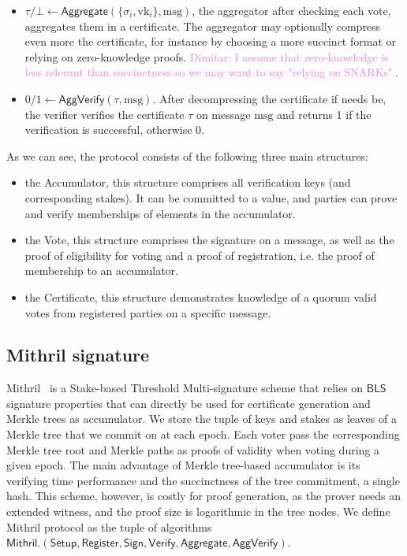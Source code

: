 \documentclass{article}
\newcommand{\vk}[1]{\ensuremath{\textrm{vk}_{#1}}\xspace}
\newcommand{\m}{\ensuremath{\textrm{msg}}\xspace}
\newcommand{\BLS}{\ensuremath{\mathsf{BLS}}\xspace}
\newcommand{\Mithril}{\ensuremath{\mathsf{Mithril}}\xspace}
\newcommand{\Sign}{\ensuremath{\mathsf{Sign}}\xspace}
\newcommand{\Verify}{\ensuremath{\mathsf{Verify}}\xspace}
\newcommand{\Aggregate}{\ensuremath{\mathsf{Aggregate}}\xspace}
\newcommand{\AggVerify}{\ensuremath{\mathsf{AggVerify}}\xspace}
\newcommand{\Setup}{\ensuremath{\mathsf{Setup}}\xspace}
\newcommand{\Register}{\ensuremath{\mathsf{Register}}\xspace}
\newcommand{\dimitar}[1]{\textcolor{violet}{Dimitar: #1}\xspace}
\begin{document}
\begin{itemize}
    \item $\tau / \bot \leftarrow \Aggregate(\{\sigma_i, \vk{i}\}, \m)$, the aggregator after checking each vote, aggregates them in a certificate.  The aggregator may optionally compress even more the certificate, for instance by choosing a more succinct format or relying on zero-knowledge proofs. \dimitar{I assume that zero-knowledge is less relevant than succinctness so we may want to say "relying on SNARKs".}. 
    
    \item $0/1 \leftarrow \AggVerify(\tau, \m)$.
    After decompressing the certificate if needs be, the verifier verifies the certificate $\tau$  on message \m and returns 1 if the verification is successful, otherwise 0.
\end{itemize}

As we can see, the protocol consists of the following three main structures:
\begin{itemize}
    \item the Accumulator, this structure comprises all verification keys (and corresponding stakes). It can be committed to a value, and parties can prove and verify memberships of elements in the accumulator.
    \item the Vote, this structure comprises the signature on a message, as well as the proof of eligibility for voting and a proof of registration, i.e. the proof of membership to an accumulator.
    \item the Certificate, this structure demonstrates knowledge of a quorum valid votes from registered parties on a specific message.
\end{itemize}

%
%
\subsection{Mithril signature}
Mithril~\cite{chaidos2024mithril} is a Stake-based Threshold Multi-signature scheme that relies on \BLS signature properties that can directly be used for certificate generation and Merkle trees as accumulator.
%
We store the tuple of keys and stakes as leaves of a Merkle tree that we commit on at each epoch. Each voter pass the corresponding Merkle tree root and Merkle paths as proofs of validity when voting during a given epoch.
The main advantage of Merkle tree-based accumulator is its verifying time performance and the succinctness of the tree commitment, a single hash. This scheme, however, is costly for proof generation, as the prover needs an extended witness, and the proof size is logarithmic in the tree nodes.
%
We define Mithril protocol as the tuple of algorithms $\Mithril.(\Setup, \Register, \Sign, \Verify, \Aggregate, \AggVerify)$.\\
\end{document}
